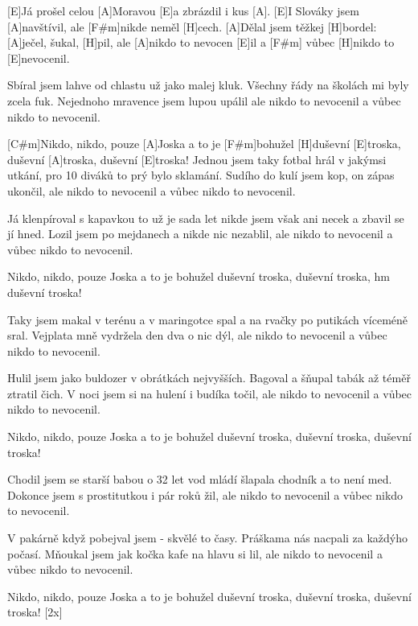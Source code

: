
[E]Já prošel celou [A]Moravou
[E]a zbrázdil i kus [A].
[E]I Slováky jsem [A]navštívil,
ale [F#m]nikde neměl [H]cech.
[A]Dělal jsem těžkej [H]bordel:
[A]ječel, šukal, [H]pil,
ale [A]nikdo to nevocen [E]il
a [F#m] vůbec [H]nikdo to [E]nevocenil.

Sbíral jsem lahve od chlastu
už jako malej kluk.
Všechny řády na školách
mi byly zcela fuk.
Nejednoho mravence
jsem lupou upálil
ale nikdo to nevocenil
a vůbec nikdo to nevocenil.

[C#m]Nikdo, nikdo, pouze [A]Joska
a to je [F#m]bohužel [H]duševní [E]troska,
duševní [A]troska, duševní [E]troska!
\slpc
Jednou jsem taky fotbal hrál
v jakýmsi utkání,
pro 10 diváků to
prý bylo sklamání.
Sudího do kulí jsem kop,
on zápas ukončil,
ale nikdo to nevocenil
a vůbec nikdo to nevocenil.


Já klenpíroval s kapavkou
to už je sada let
nikde jsem však ani necek
a zbavil se jí hned.
Lozil jsem po mejdanech
a nikde nic nezablil,
ale nikdo to nevocenil
a vůbec nikdo to nevocenil.

Nikdo, nikdo, pouze Joska
a to je bohužel duševní troska,
duševní troska, hm duševní troska!

Taky jsem makal v terénu
a v maringotce spal
a na rvačky po putikách
víceméně sral.
Vejplata mně vydržela
den dva o nic dýl,
ale nikdo to nevocenil
a vůbec nikdo to nevocenil.

Hulil jsem jako buldozer
v obrátkách nejvyšších.
Bagoval a šňupal tabák
až téměř ztratil čich.
V noci jsem si na hulení
i budíka točil,
ale nikdo to nevocenil
a vůbec nikdo to nevocenil.

Nikdo, nikdo, pouze Joska
a to je bohužel duševní troska,
duševní troska, duševní troska!


Chodil jsem se starší babou
o 32 let
vod mládí šlapala chodník
a to není med.
Dokonce jsem s prostitutkou
i pár roků žil,
ale nikdo to nevocenil
a vůbec nikdo to nevocenil.

V pakárně když pobejval jsem
- skvělé to časy.
Práškama nás nacpali
za každýho počasí.
Mňoukal jsem jak kočka
kafe na hlavu si lil,
ale nikdo to nevocenil
a vůbec nikdo to nevocenil.

Nikdo, nikdo, pouze Joska
a to je bohužel duševní troska,
duševní troska, duševní troska! [2x]


